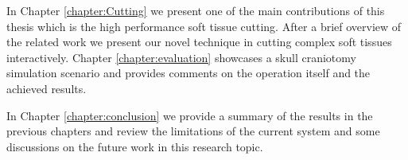 In Chapter \ref{chapter:Cutting} we present one of the main contributions of this thesis which is the high 
performance soft tissue cutting. After a brief overview of the related work we present our novel technique 
in cutting complex soft tissues interactively. Chapter \ref{chapter:evaluation} showcases a skull craniotomy 
simulation scenario and provides comments on the operation itself and the achieved results.

In Chapter \ref{chapter:conclusion} we provide a summary of the results in the previous chapters and 
review the limitations of the current system and some discussions on the future work in this research topic.















